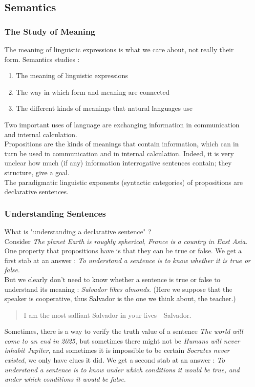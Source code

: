 \documentclass{cours}
\begin{document}
\subsection{Semantics}
\subsubsection{The Study of Meaning}
The meaning of linguistic expressions is what we care about, not really their form. Semantics studies\! : 
\begin{enumerate}
    \item The meaning of linguistic expressions
    \item The way in which form and meaning are connected
    \item The different kinds of meanings that natural languages use
\end{enumerate}
Two important uses of language are exchanging information in communication and internal calculation.\\
Propositions are the kinds of meanings that contain information, which can in turn be used in communication and in internal calculation. Indeed, it is very unclear how much (if any) information interrogative sentences contain; they structure, give a goal. \\
The paradigmatic linguistic exponents (syntactic categories) of propositions are declarative sentences.

\subsubsection{Understanding Sentences}
What is "understanding a declarative sentence" ?\\

Consider \textsl{The planet Earth is roughly spherical}, \textsl{France is a country in East Asia}. One property that propositions have is that they can be true or false. We get a first stab at an answer\! : \textit{To understand a sentence is to know whether it is true or false.}\\

But we clearly don't need to know whether a sentence is true or false to understand its meaning\! : \textit{Salvador likes almonds}. (Here we suppose that the speaker is cooperative, thus Salvador is the one we think about, the teacher.)
\begin{quotation}
    I am the most salliant Salvador in your lives - Salvador.
\end{quotation}
Sometimes, there is a way to verify the truth value of a sentence \textsl{The world will come to an end in 2025}, but sometimes there might not be \textsl{Humans will never inhabit Jupiter}, and sometimes it is impossible to be certain \textsl{Socrates never existed}, we only have clues it did. We get a second stab at an answer\! : \textit{To understand a sentence is to know under which conditions it would be true, and under which conditions it would be false.}\\
\end{document}
